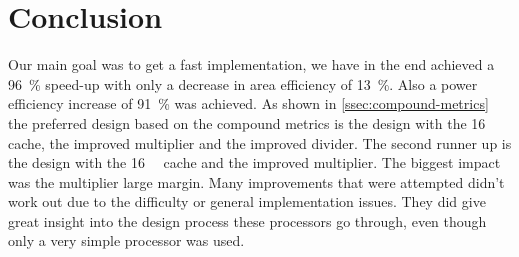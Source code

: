 \documentclass[final]{article}
\begin{document}
\section{Conclusion}
\label{sec:conclusion}
Our main goal was to get a fast implementation, we have in the end achieved a \SI{96}{\percent} speed-up with only a decrease in area efficiency of \SI{13}{\percent}.
Also a power efficiency increase of \SI{91}{\percent} was achieved.
As shown in \cref{ssec:compound-metrics} the preferred design based on the compound metrics is the design with the \SI{16}{\kibi\byte} cache, the improved multiplier and the improved divider.
The second runner up is the design with the \SI{16}{\kibi\byte} cache and the improved multiplier.
The biggest impact was the multiplier large margin.
Many improvements that were attempted didn't work out due to the difficulty or general implementation issues.
They did give great insight into the design process these processors go through, even though only a very simple processor was used.
\end{document}
